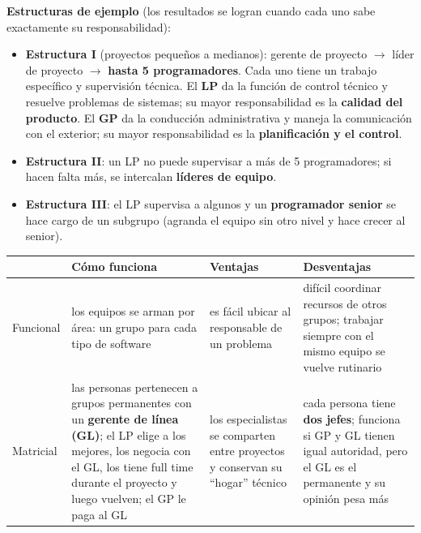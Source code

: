 \documentclass[11pt,a4paper]{article}
\begin{document}
\textbf{Estructuras de ejemplo} (los resultados se logran cuando cada uno sabe exactamente su responsabilidad):
\begin{itemize}
  \item \textbf{Estructura I} (proyectos pequeños a medianos): gerente de proyecto $\to$ líder de proyecto $\to$
  \textbf{hasta 5 programadores}. Cada uno tiene un trabajo específico y supervisión técnica. El \textbf{LP} da
  la función de control técnico y resuelve problemas de sistemas; su mayor responsabilidad es la
  \textbf{calidad del producto}. El \textbf{GP} da la conducción administrativa y maneja la comunicación con el
  exterior; su mayor responsabilidad es la \textbf{planificación y el control}.
  \item \textbf{Estructura II}: un LP no puede supervisar a más de 5 programadores; si hacen falta más, se
  intercalan \textbf{líderes de equipo}.
  \item \textbf{Estructura III}: el LP supervisa a algunos y un \textbf{programador senior} se hace cargo de un
  subgrupo (agranda el equipo sin otro nivel y hace crecer al senior).
\end{itemize}
\begin{center}\small
\begin{tabularx}{\textwidth}{@{}l X X X@{}}
\toprule
 & \textbf{Cómo funciona} & \textbf{Ventajas} & \textbf{Desventajas}\\
\midrule
Funcional & los equipos se arman por área: un grupo para cada tipo de software & es fácil ubicar al
responsable de un problema & difícil coordinar recursos de otros grupos; trabajar siempre con el mismo equipo se
vuelve rutinario\\
Matricial & las personas pertenecen a grupos permanentes con un \textbf{gerente de línea (GL)}; el LP elige a los
mejores, los negocia con el GL, los tiene full time durante el proyecto y luego vuelven; el GP le paga al GL &
los especialistas se comparten entre proyectos y conservan su ``hogar'' técnico & cada persona tiene \textbf{dos
jefes}; funciona si GP y GL tienen igual autoridad, pero el GL es el permanente y su opinión pesa más\\
\bottomrule
\end{tabularx}
\end{center}
\end{document}
